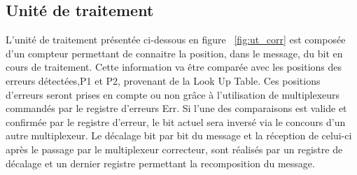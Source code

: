 \documentclass[a4paper, 11pt, svgnames]{report}
\begin{document}
            \subsection{Unité de traitement}
                L'unité de traitement présentée ci-dessous en
                figure ~\ref{fig:ut_corr} est composée d'un compteur
                permettant de connaitre la position, dans le message, du bit en
                cours de traitement. Cette information va être comparée avec
                les positions des erreurs détectées,P1 et P2, provenant de la
                Look Up Table. Ces positions d'erreurs seront prises en compte
                ou non grâce à l'utilisation de multiplexeurs commandés par le
                registre d'erreurs Err. Si l'une des comparaisons est valide et
                confirmée par le registre d'erreur, le bit actuel sera inversé
                via le concours d'un autre multiplexeur. Le décalage bit par
                bit du message et la réception de celui-ci après le passage par
                le multiplexeur correcteur, sont réalisés par un registre de
                décalage et un dernier registre permettant la recomposition
                du message.
\end{document}
